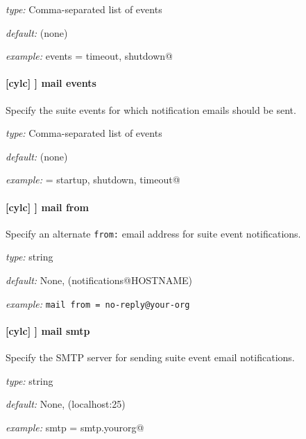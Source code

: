 \begin{myitemize}
    \item {\em type:} Comma-separated list of events
    \item {\em default:} (none)
    \item {\em example:} \lstinline@handler events = timeout, shutdown@
\end{myitemize}

\paragraph[mail events]{[cylc] \textrightarrow [[events]] \textrightarrow mail events}

Specify the suite events for which notification emails should be sent.

\begin{myitemize}
    \item {\em type:} Comma-separated list of events
    \item {\em default:} (none)
    \item {\em example:} \lstinline@handler = startup, shutdown, timeout@
\end{myitemize}

\paragraph[mail from]{[cylc] \textrightarrow [[events]] \textrightarrow mail from}

Specify an alternate \lstinline=from:= email address for suite event notifications.

\begin{myitemize}
    \item {\em type:} string
    \item {\em default:} None, (notifications@HOSTNAME)
    \item {\em example:} \lstinline|mail from = no-reply@your-org|
\end{myitemize}

\paragraph[mail smtp]{[cylc] \textrightarrow [[events]] \textrightarrow mail smtp}

Specify the SMTP server for sending suite event email notifications.

\begin{myitemize}
    \item {\em type:} string
    \item {\em default:} None, (localhost:25)
    \item {\em example:} \lstinline@mail smtp = smtp.yourorg@
\end{myitemize}

